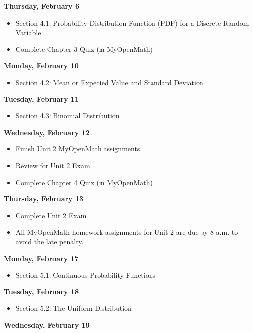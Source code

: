 \documentclass[11pt]{article}
\begin{document}
\textbf{Thursday, February 6}

\begin{itemize}
\item Section 4.1: Probability Distribution Function (PDF) for a Discrete Random Variable
\item Complete Chapter 3 Quiz (in MyOpenMath)
\end{itemize}

\textbf{Monday, February 10}

\begin{itemize}
\item Section 4.2: Mean or Expected Value and Standard Deviation
\end{itemize}

\textbf{Tuesday, February 11}

\begin{itemize}
\item Section 4.3: Binomial Distribution
\end{itemize}

\textbf{Wednesday, February 12}

\begin{itemize}
\item Finish Unit 2 MyOpenMath assignments
\item Review for Unit 2 Exam
\item Complete Chapter 4 Quiz (in MyOpenMath)
\end{itemize}

\textbf{Thursday, February 13}

\begin{itemize}
\item Complete Unit 2 Exam
\item All MyOpenMath homework assignments for Unit 2 are due by 8 a.m. to avoid the late penalty.
\end{itemize}

\textbf{Monday, February 17}

\begin{itemize}
\item Section 5.1: Continuous Probability Functions
\end{itemize}

\textbf{Tuesday, February 18}

\begin{itemize}
\item Section 5.2: The Uniform Distribution
\end{itemize}

\textbf{Wednesday, February 19}
\end{document}
